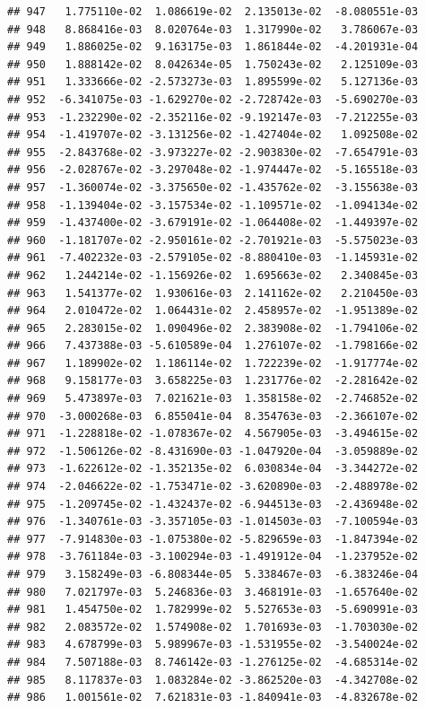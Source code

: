\documentclass[
]{article}
\begin{document}
\begin{verbatim}
## 947   1.775110e-02  1.086619e-02  2.135013e-02  -8.080551e-03
## 948   8.868416e-03  8.020764e-03  1.317990e-02   3.786067e-03
## 949   1.886025e-02  9.163175e-03  1.861844e-02  -4.201931e-04
## 950   1.888142e-02  8.042634e-05  1.750243e-02   2.125109e-03
## 951   1.333666e-02 -2.573273e-03  1.895599e-02   5.127136e-03
## 952  -6.341075e-03 -1.629270e-02 -2.728742e-03  -5.690270e-03
## 953  -1.232290e-02 -2.352116e-02 -9.192147e-03  -7.212255e-03
## 954  -1.419707e-02 -3.131256e-02 -1.427404e-02   1.092508e-02
## 955  -2.843768e-02 -3.973227e-02 -2.903830e-02  -7.654791e-03
## 956  -2.028767e-02 -3.297048e-02 -1.974447e-02  -5.165518e-03
## 957  -1.360074e-02 -3.375650e-02 -1.435762e-02  -3.155638e-03
## 958  -1.139404e-02 -3.157534e-02 -1.109571e-02  -1.094134e-02
## 959  -1.437400e-02 -3.679191e-02 -1.064408e-02  -1.449397e-02
## 960  -1.181707e-02 -2.950161e-02 -2.701921e-03  -5.575023e-03
## 961  -7.402232e-03 -2.579105e-02 -8.880410e-03  -1.145931e-02
## 962   1.244214e-02 -1.156926e-02  1.695663e-02   2.340845e-03
## 963   1.541377e-02  1.930616e-03  2.141162e-02   2.210450e-03
## 964   2.010472e-02  1.064431e-02  2.458957e-02  -1.951389e-02
## 965   2.283015e-02  1.090496e-02  2.383908e-02  -1.794106e-02
## 966   7.437388e-03 -5.610589e-04  1.276107e-02  -1.798166e-02
## 967   1.189902e-02  1.186114e-02  1.722239e-02  -1.917774e-02
## 968   9.158177e-03  3.658225e-03  1.231776e-02  -2.281642e-02
## 969   5.473897e-03  7.021621e-03  1.358158e-02  -2.746852e-02
## 970  -3.000268e-03  6.855041e-04  8.354763e-03  -2.366107e-02
## 971  -1.228818e-02 -1.078367e-02  4.567905e-03  -3.494615e-02
## 972  -1.506126e-02 -8.431690e-03 -1.047920e-04  -3.059889e-02
## 973  -1.622612e-02 -1.352135e-02  6.030834e-04  -3.344272e-02
## 974  -2.046622e-02 -1.753471e-02 -3.620890e-03  -2.488978e-02
## 975  -1.209745e-02 -1.432437e-02 -6.944513e-03  -2.436948e-02
## 976  -1.340761e-03 -3.357105e-03 -1.014503e-03  -7.100594e-03
## 977  -7.914830e-03 -1.075380e-02 -5.829659e-03  -1.847394e-02
## 978  -3.761184e-03 -3.100294e-03 -1.491912e-04  -1.237952e-02
## 979   3.158249e-03 -6.808344e-05  5.338467e-03  -6.383246e-04
## 980   7.021797e-03  5.246836e-03  3.468191e-03  -1.657640e-02
## 981   1.454750e-02  1.782999e-02  5.527653e-03  -5.690991e-03
## 982   2.083572e-02  1.574908e-02  1.701693e-03  -1.703030e-02
## 983   4.678799e-03  5.989967e-03 -1.531955e-02  -3.540024e-02
## 984   7.507188e-03  8.746142e-03 -1.276125e-02  -4.685314e-02
## 985   8.117837e-03  1.083284e-02 -3.862520e-03  -4.342708e-02
## 986   1.001561e-02  7.621831e-03 -1.840941e-03  -4.832678e-02

\end{verbatim}
\end{document}
